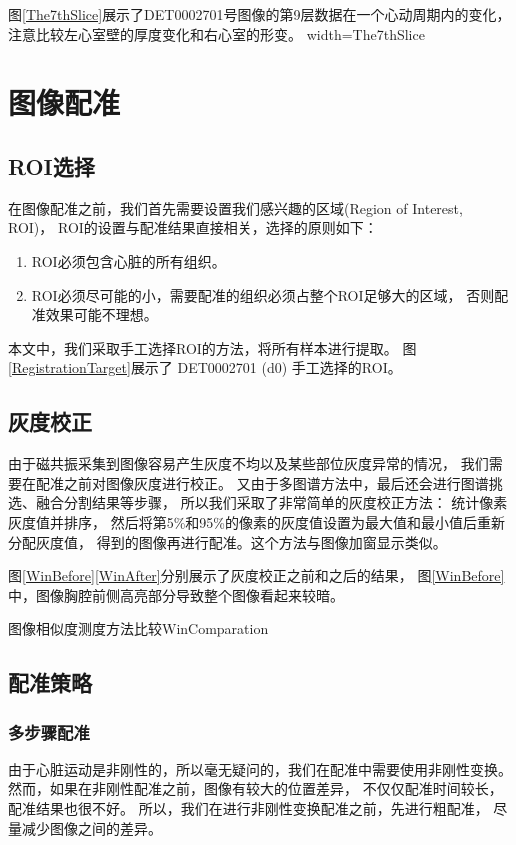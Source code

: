 图\ref{The7thSlice}展示了DET0002701号图像的第9层数据在一个心动周期内的变化，
注意比较左心室壁的厚度变化和右心室的形变。
%
{width=\textwidth}{The7thSlice}

\section{图像配准}
\subsection{ROI选择}
在图像配准之前，我们首先需要设置我们感兴趣的区域(Region of Interest, ROI)，
ROI的设置与配准结果直接相关，选择的原则如下：
\begin{enumerate}
  \item ROI必须包含心脏的所有组织。
  \item ROI必须尽可能的小，需要配准的组织必须占整个ROI足够大的区域，
    否则配准效果可能不理想。
\end{enumerate}
    本文中，我们采取手工选择ROI的方法，将所有样本进行提取。
    图\ref{RegistrationTarget}展示了 DET0002701 (d0) 手工选择的ROI。

\subsection{灰度校正}
由于磁共振采集到图像容易产生灰度不均以及某些部位灰度异常的情况，
我们需要在配准之前对图像灰度进行校正。
又由于多图谱方法中，最后还会进行图谱挑选、融合分割结果等步骤，
所以我们采取了非常简单的灰度校正方法：
统计像素灰度值并排序，
然后将第5\%和95\%的像素的灰度值设置为最大值和最小值后重新分配灰度值，
得到的图像再进行配准。这个方法与图像加窗显示类似。

图\ref{WinBefore}\ref{WinAfter}分别展示了灰度校正之前和之后的结果，
图\ref{WinBefore}中，图像胸腔前侧高亮部分导致整个图像看起来较暗。
\begin{pics}[htpb]{图像相似度测度方法比较}{WinComparation}
\end{pics}

\subsection{配准策略}
\subsubsection{多步骤配准}
由于心脏运动是非刚性的，所以毫无疑问的，我们在配准中需要使用非刚性变换。
然而，如果在非刚性配准之前，图像有较大的位置差异，
不仅仅配准时间较长，配准结果也很不好。
所以，我们在进行非刚性变换配准之前，先进行粗配准，
尽量减少图像之间的差异。

